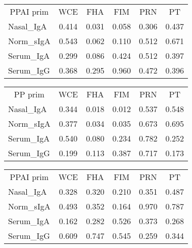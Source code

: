 \documentclass[
]{article}
\begin{document}
\begin{tabular}{>{}l|>{}c|>{}c|>{}c|>{}c|c}
\hline
\multicolumn{1}{c|}{PPAI prim} & \multicolumn{1}{c|}{WCE} & \multicolumn{1}{c|}{FHA} & \multicolumn{1}{c|}{FIM} & \multicolumn{1}{c|}{PRN} & \multicolumn{1}{c}{PT} \\
\cline{1-1} \cline{2-2} \cline{3-3} \cline{4-4} \cline{5-5} \cline{6-6}
Nasal\_IgA & 0.414 & 0.031 & 0.058 & 0.306 & 0.437\\
\hline
Norm\_sIgA & 0.543 & 0.062 & 0.110 & 0.512 & 0.671\\
\hline
Serum\_IgA & 0.299 & 0.086 & 0.424 & 0.512 & 0.397\\
\hline
Serum\_IgG & 0.368 & 0.295 & 0.960 & 0.472 & 0.396\\
\hline
\end{tabular}

\begin{tabular}{>{}l|>{}c|>{}c|>{}c|>{}c|c}
\hline
\multicolumn{1}{c|}{PP prim} & \multicolumn{1}{c|}{WCE} & \multicolumn{1}{c|}{FHA} & \multicolumn{1}{c|}{FIM} & \multicolumn{1}{c|}{PRN} & \multicolumn{1}{c}{PT} \\
\cline{1-1} \cline{2-2} \cline{3-3} \cline{4-4} \cline{5-5} \cline{6-6}
Nasal\_IgA & 0.344 & 0.018 & 0.012 & 0.537 & 0.548\\
\hline
Norm\_sIgA & 0.377 & 0.034 & 0.035 & 0.673 & 0.695\\
\hline
Serum\_IgA & 0.540 & 0.080 & 0.234 & 0.782 & 0.252\\
\hline
Serum\_IgG & 0.199 & 0.113 & 0.387 & 0.717 & 0.173\\
\hline
\end{tabular}

\begin{tabular}{>{}l|>{}c|>{}c|>{}c|>{}c|c}
\hline
\multicolumn{1}{c|}{PPAI prim} & \multicolumn{1}{c|}{WCE} & \multicolumn{1}{c|}{FHA} & \multicolumn{1}{c|}{FIM} & \multicolumn{1}{c|}{PRN} & \multicolumn{1}{c}{PT} \\
\cline{1-1} \cline{2-2} \cline{3-3} \cline{4-4} \cline{5-5} \cline{6-6}
Nasal\_IgA & 0.328 & 0.320 & 0.210 & 0.351 & 0.487\\
\hline
Norm\_sIgA & 0.493 & 0.352 & 0.164 & 0.970 & 0.787\\
\hline
Serum\_IgA & 0.162 & 0.282 & 0.526 & 0.373 & 0.268\\
\hline
Serum\_IgG & 0.609 & 0.747 & 0.545 & 0.259 & 0.344\\
\hline
\end{tabular}
\end{document}
